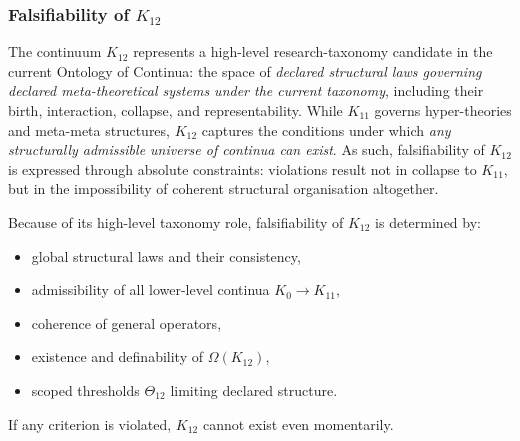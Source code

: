 
\subsubsection{Falsifiability of $K_{12}$}
\label{sec:falsifiability-k12}

The continuum $K_{12}$ represents a high-level research-taxonomy candidate in the
current Ontology of Continua: the space of \emph{declared structural
laws governing declared meta-theoretical systems under the current taxonomy}, including their
birth, interaction, collapse, and representability. While $K_{11}$
governs hyper-theories and meta-meta structures, $K_{12}$ captures the
conditions under which \emph{any structurally admissible universe of
continua can exist}. As such, falsifiability of $K_{12}$ is expressed
through absolute constraints: violations result not in collapse to
$K_{11}$, but in the impossibility of coherent structural organisation
altogether.

Because of its high-level taxonomy role, falsifiability of $K_{12}$ is determined
by:

\begin{itemize}
    \item global structural laws and their consistency,
    \item admissibility of all lower-level continua $K_0 \to K_{11}$,
    \item coherence of general operators,
    \item existence and definability of $\Omega(K_{12})$,
    \item scoped thresholds $\Theta_{12}$ limiting declared structure.
\end{itemize}

If any criterion is violated, $K_{12}$ cannot exist even momentarily.



